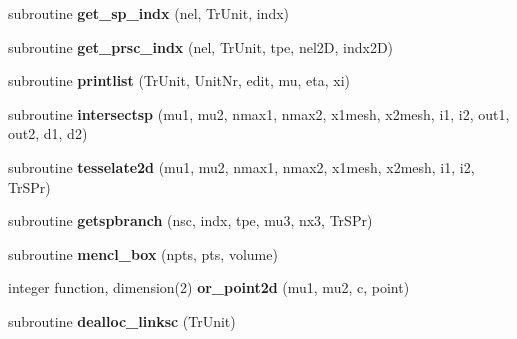 \begin{DoxyCompactItemize}
\item 
\hypertarget{classtracking__routines_a449a07e6fb92ba0a8ee66c9a523da180}{subroutine {\bfseries get\-\_\-sp\-\_\-indx} (nel, Tr\-Unit, indx)}\label{classtracking__routines_a449a07e6fb92ba0a8ee66c9a523da180}

\item 
\hypertarget{classtracking__routines_a1f0cf3672641eeb44165c84dc1ae539f}{subroutine {\bfseries get\-\_\-prsc\-\_\-indx} (nel, Tr\-Unit, tpe, nel2\-D, indx2\-D)}\label{classtracking__routines_a1f0cf3672641eeb44165c84dc1ae539f}

\item 
\hypertarget{classtracking__routines_a08d1ef6f9e0330a796c7d15be2fb3ad0}{subroutine {\bfseries printlist} (Tr\-Unit, Unit\-Nr, edit, mu, eta, xi)}\label{classtracking__routines_a08d1ef6f9e0330a796c7d15be2fb3ad0}

\item 
\hypertarget{classtracking__routines_abeedf89a67b102bfdf8508ceeac45b38}{subroutine {\bfseries intersectsp} (mu1, mu2, nmax1, nmax2, x1mesh, x2mesh, i1, i2, out1, out2, d1, d2)}\label{classtracking__routines_abeedf89a67b102bfdf8508ceeac45b38}

\item 
\hypertarget{classtracking__routines_a8334bac9985b4cc57231d438f99fca01}{subroutine {\bfseries tesselate2d} (mu1, mu2, nmax1, nmax2, x1mesh, x2mesh, i1, i2, Tr\-S\-Pr)}\label{classtracking__routines_a8334bac9985b4cc57231d438f99fca01}

\item 
\hypertarget{classtracking__routines_aacdbde7e1e2aff7181d98f5c879fa805}{subroutine {\bfseries getspbranch} (nsc, indx, tpe, mu3, nx3, Tr\-S\-Pr)}\label{classtracking__routines_aacdbde7e1e2aff7181d98f5c879fa805}

\item 
\hypertarget{classtracking__routines_a1540146044b9cbf18e6da7fd82c3bfdf}{subroutine {\bfseries mencl\-\_\-box} (npts, pts, volume)}\label{classtracking__routines_a1540146044b9cbf18e6da7fd82c3bfdf}

\item 
\hypertarget{classtracking__routines_ad4d274c8431811e7f9bf2e1e91ad840e}{integer function, dimension(2) {\bfseries or\-\_\-point2d} (mu1, mu2, c, point)}\label{classtracking__routines_ad4d274c8431811e7f9bf2e1e91ad840e}

\item 
\hypertarget{classtracking__routines_aa30737dc6be18db2a4c90ae97e0b53c5}{subroutine {\bfseries dealloc\-\_\-linksc} (Tr\-Unit)}\label{classtracking__routines_aa30737dc6be18db2a4c90ae97e0b53c5}


\end{DoxyCompactItemize}
